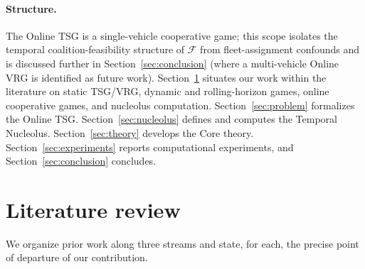 \documentclass[11pt]{article}
\theoremstyle{plain}
\theoremstyle{definition}
\theoremstyle{remark}
\newcommand{\F}{\mathcal{F}}
\begin{document}
\paragraph{Structure.} The Online TSG is a single-vehicle cooperative game; this scope isolates the temporal coalition-feasibility structure of $\F$ from fleet-assignment confounds and is discussed further in Section~\ref{sec:conclusion} (where a multi-vehicle Online VRG is identified as future work). Section~\ref{sec:related} situates our work within the literature on static TSG/VRG, dynamic and rolling-horizon games, online cooperative games, and nucleolus computation. Section~\ref{sec:problem} formalizes the Online TSG. Section~\ref{sec:nucleolus} defines and computes the Temporal Nucleolus. Section~\ref{sec:theory} develops the Core theory. Section~\ref{sec:experiments} reports computational experiments, and Section~\ref{sec:conclusion} concludes.

\section{Literature review}
\label{sec:related}

We organize prior work along three streams and state, for each, the precise point of departure of our contribution.
\end{document}
